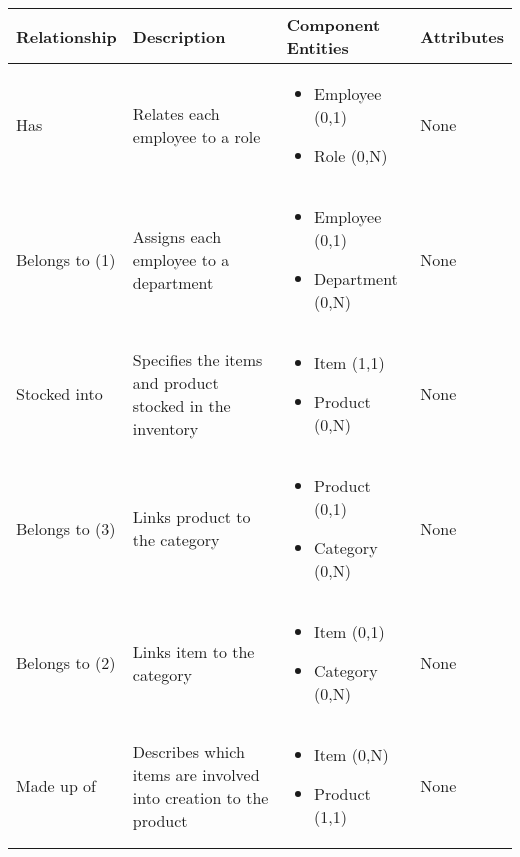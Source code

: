 \begin{longtable}{|p{}|p{} |p{}|p{} |} 
\hline
\textbf{Relationship} & \textbf{Description} & \textbf{Component Entities} & \textbf{Attributes} \\\hline


Has & Relates each employee to a role & \begin{itemize}
        \vspace{-1em}
        \item Employee (0,1)
        \item Role (0,N)
    \end{itemize}
 &  None \\\hline
 
Belongs to (1) & Assigns each employee to a department & \begin{itemize}
        \vspace{-1em}
        \item Employee (0,1)
        \item Department (0,N)
    \end{itemize}
 &  None \\\hline

Stocked into & Specifies the items and product stocked in the inventory & \begin{itemize}
	\vspace{-1em}
	\item Item (1,1)
	\item Product (0,N)
\end{itemize}
&  None \\\hline

Belongs to (3) & Links product to the category  & \begin{itemize}
	\vspace{-1em}
	\item Product (0,1)
	\item Category (0,N)
\end{itemize}
&  None \\\hline

Belongs to (2) & Links item to the category & \begin{itemize}
	\vspace{-1em}
	\item Item (0,1)
	\item Category (0,N)
\end{itemize}
&  None \\\hline

Made up of & Describes which items are involved into creation to the product & \begin{itemize}
	\vspace{-1em}
	\item Item (0,N)
	\item Product (1,1)
\end{itemize}
&  None \\\hline


\end{longtable}
